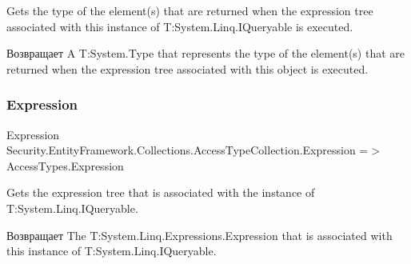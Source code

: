 Gets the type of the element(s) that are returned when the expression tree associated with this instance of T\+:\+System.\+Linq.\+I\+Queryable is executed. 

\begin{DoxyReturn}{Возвращает}
A T\+:\+System.\+Type that represents the type of the element(s) that are returned when the expression tree associated with this object is executed. 
\end{DoxyReturn}
\mbox{\label{class_security_1_1_entity_framework_1_1_collections_1_1_access_type_collection_a1e2fd9534e15a7266ba726e96683d9f5}} 
\subsubsection{\texorpdfstring{Expression}{Expression}}
{\footnotesize\ttfamily Expression Security.\+Entity\+Framework.\+Collections.\+Access\+Type\+Collection.\+Expression =$>$ Access\+Types.\+Expression}



Gets the expression tree that is associated with the instance of T\+:\+System.\+Linq.\+I\+Queryable. 

\begin{DoxyReturn}{Возвращает}
The T\+:\+System.\+Linq.\+Expressions.\+Expression that is associated with this instance of T\+:\+System.\+Linq.\+I\+Queryable. 
\end{DoxyReturn}
\mbox{\label{class_security_1_1_entity_framework_1_1_collections_1_1_access_type_collection_a26c4ac1e425ca728ee970e2c75e6320b}} 
